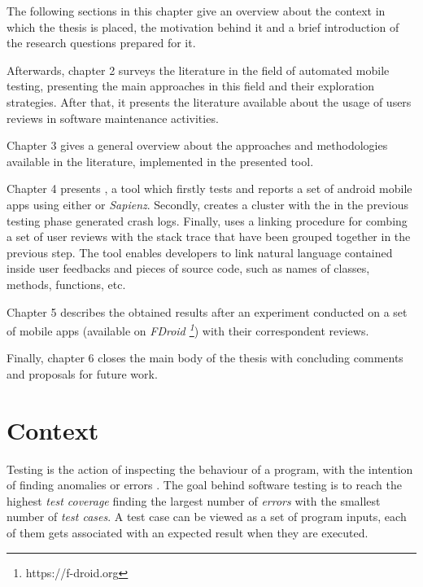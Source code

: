 The following sections in this chapter give an overview about the context in which the thesis is placed, the motivation behind it and a brief introduction of the research questions prepared for it. 

Afterwards, chapter 2 surveys the literature in the field of automated mobile testing, presenting the main approaches in this field and their exploration strategies. After that, it presents the literature available about the usage of users reviews in software maintenance activities. 

Chapter 3 gives a general overview about the approaches and methodologies available in the literature, implemented in the presented tool. 

Chapter 4 presents \toolname, a tool which firstly tests and reports a set of android mobile apps using either \monkey or \textit{Sapienz}.  Secondly, creates a cluster with the in the previous testing phase generated crash logs. Finally, uses a linking procedure for combing a set of user reviews with the stack trace that have been grouped together in the previous step. The tool enables developers to link natural language contained inside user feedbacks and pieces of source code, such as names of classes, methods, functions, etc. 

Chapter 5 describes the obtained results after an experiment conducted on a set of mobile apps (available on \textit{FDroid \footnote{https://f-droid.org}}) with their correspondent reviews. 

Finally, chapter 6 closes the main body of the thesis with concluding comments and proposals for future work.


\section{Context}
Testing is the action of inspecting the behaviour of a program, with the intention of finding anomalies or errors \cite{testing}.
The goal behind software testing is to reach the highest \textit{test coverage} finding the largest number of \textit{errors} with the smallest number of \textit{test cases}. A test case can be viewed as a set of program inputs, each of them gets associated with an expected result when they are executed. 

